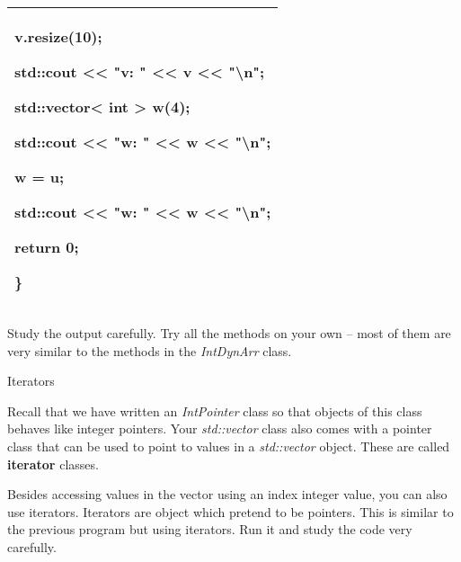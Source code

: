 \documentclass[
]{article}
\begin{document}
\begin{longtable}[]{@{}l@{}}
\begin{minipage}[t]{0.97\columnwidth}
v.resize(10);

std::cout \textless\textless{} "v: " \textless\textless{} v
\textless\textless{} "\textbackslash n";

std::vector\textless{} int \textgreater{} w(4);

std::cout \textless\textless{} "w: " \textless\textless{} w
\textless\textless{} "\textbackslash n";

w = u;

std::cout \textless\textless{} "w: " \textless\textless{} w
\textless\textless{} "\textbackslash n";

return 0;

\}\strut
\end{minipage}\tabularnewline
\bottomrule
\end{longtable}

Study the output carefully. Try all the methods on your own -- most of
them are very similar to the methods in the \emph{IntDynArr} class.

Iterators

Recall that we have written an \emph{IntPointer} class so that objects
of this class behaves like integer pointers. Your \emph{std::vector}
class also comes with a pointer class that can be used to point to
values in a \emph{std::vector} object. These are called
\textbf{iterator} classes.

Besides accessing values in the vector using an index integer value, you
can also use iterators. Iterators are object which pretend to be
pointers. This is similar to the previous program but using iterators.
Run it and study the code very carefully.
\end{document}

